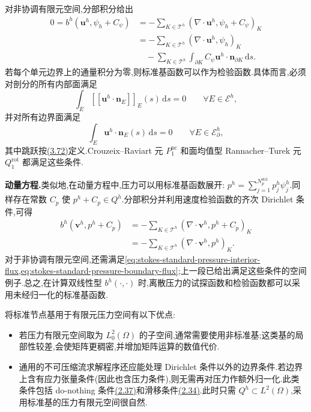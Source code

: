 \begin{note}
对非协调有限元空间,分部积分给出
\[
\begin{aligned}
  0=b^h(\bm{u}^h,\psi_h+C_\psi)
  &=-\sum_{K\in\mathcal{T}^h}
       (\nabla\cdot\bm{u}^h,\psi_h+C_\psi)_K\\
  &=-\sum_{K\in\mathcal{T}^h}
       (\nabla\cdot\bm{u}^h,\psi_h)_K\\
  &\quad-\sum_{K\in\mathcal{T}^h}
       \int_{\partial K}C_\psi\bm{u}^h\cdot
          \bm{n}_{\partial K}\,\mathrm{d}s.
\end{aligned}
\]
若每个单元边界上的通量积分为零,则标准基函数可以作为检验函数.具体而言,必须对剖分的所有内部面满足
\begin{equation}\label{eq:stokes-standard-pressure-interior-flux}
  \int_E\left[\!\left[\bm{u}^h\cdot\bm{n}_E\right]\!\right]_E(s)
       \,\mathrm{d}s=0\qquad\forall E\in\mathcal{E}^h,
\end{equation}
并对所有边界面满足
\begin{equation}\label{eq:stokes-standard-pressure-boundary-flux}
  \int_E\bm{u}^h\cdot\bm{n}_E(s)\,\mathrm{d}s=0
       \qquad\forall E\in\mathcal{E}_{\partial}^h,
\end{equation}
其中跳跃按\hyperref[eq:jump-definition]{(3.72)}定义.Crouzeix--Raviart 元 $P_1^{\mathrm{nc}}$ 和面均值型 Rannacher--Turek 元 $Q_1^{\mathrm{rot}}$ 都满足这些条件.

\textbf{动量方程.}类似地,在动量方程中,压力可以用标准基函数展开:
$p^h=\sum_{j=1}^{N_p^{\mathrm{std}}}p_j^h\psi_j^h$.同样存在常数 $C_p$ 使
$p^h+C_p\in Q^h$.分部积分并利用速度检验函数的齐次 Dirichlet 条件,可得
\[
\begin{aligned}
 b^h(\bm{v}^h,p^h+C_p)
 &=-\sum_{K\in\mathcal{T}^h}
       (\nabla\cdot\bm{v}^h,p^h+C_p)_K\\
 &=-\sum_{K\in\mathcal{T}^h}
       (\nabla\cdot\bm{v}^h,p^h)_K.
\end{aligned}
\]
对于非协调有限元空间,还需满足\cref{eq:stokes-standard-pressure-interior-flux,eq:stokes-standard-pressure-boundary-flux};上一段已给出满足这些条件的空间例子.总之,在计算双线性型 $b^h(\cdot,\cdot)$ 时,离散压力的试探函数和检验函数都可以采用未经归一化的标准基函数.

将标准节点基用于有限元压力空间有以下优点:
\begin{itemize}
  \item 若压力有限元空间取为 $L_0^2(\Omega)$ 的子空间,通常需要使用非标准基;这类基的局部性较差,会使矩阵更稠密,并增加矩阵运算的数值代价.
  \item 通用的不可压缩流求解程序还应能处理 Dirichlet 条件以外的边界条件.若边界上含有应力张量条件(因此也含压力条件),则无需再对压力作额外归一化.此类条件包括 do-nothing 条件\hyperref[eq:do-nothing-condition]{(2.37)}和滑移条件\hyperref[eq:free-slip-condition]{(2.34)}.此时只需 $Q^h\subset L^2(\Omega)$,采用标准基的压力有限元空间很自然.
\end{itemize}
\end{note}
